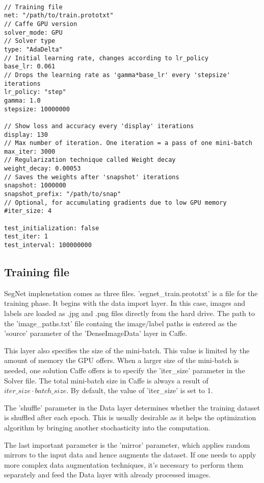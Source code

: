 \begin{lstlisting}

// Training file
net: "/path/to/train.prototxt"	
// Caffe GPU version
solver_mode: GPU
// Solver type		
type: "AdaDelta"
// Initial learning rate, changes according to lr_policy		
base_lr: 0.061		
// Drops the learning rate as 'gamma*base_lr' every 'stepsize' iterations
lr_policy: "step"		 	
gamma: 1.0
stepsize: 10000000

// Show loss and accuracy every 'display' iterations
display: 130
// Max number of iteration. One iteration = a pass of one mini-batch			
max_iter: 3000	
// Regularization technique called Weight decay		
weight_decay: 0.00053	
// Saves the weights after 'snapshot' iterations
snapshot: 1000000		
snapshot_prefix: "/path/to/snap" 
// Optional, for accumulating gradients due to low GPU memory 
#iter_size: 4			

test_initialization: false	
test_iter: 1
test_interval: 100000000

\end{lstlisting}

\subsection{Training file}

SegNet implenetation comes as three files. 'segnet\_train.prototxt' is a file for the training phase. It begins with the data import layer. In this case, images and labels are loaded as .jpg and .png files directly from the hard drive. The path to the 'image\_paths.txt' file containg the image/label paths is entered as the 'source' parameter of the 'DenseImageData' layer in Caffe.

This layer also specifies the size of the mini-batch. This value is limited by the amount of memory the GPU offers. When a larger size of the mini-batch is needed, one solution Caffe offers is to specify the 'iter\_size' parameter in the Solver file. The total mini-batch size in Caffe is always a result of $iter\_size \cdot batch\_size$. By default, the value of 'iter\_size' is set to 1.

The 'shuffle' parameter in the Data layer determines whether the training dataset is shuffled after each epoch. This is usually desirable as it helps the optimization algorithm by bringing another stochasticity into the computation. 

The last important parameter is the 'mirror' parameter, which applies random mirrors to the input data and hence augments the dataset. If one needs to apply more complex data augmentation techniques, it's necessary to perform them separately and feed the Data layer with already processed images.

